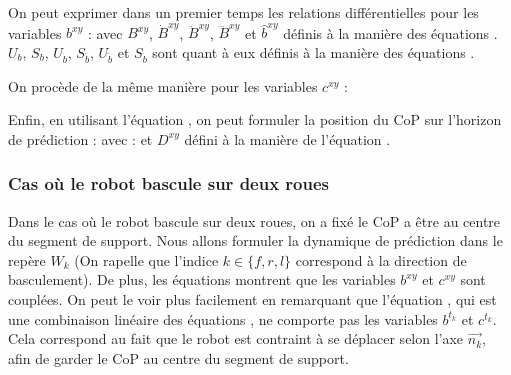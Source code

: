 				On peut exprimer dans un premier temps les relations différentielles pour les variables $b^{xy}$ :
				avec $B^{xy}$, $\dot{B}^{xy}$, $\ddot{B}^{xy}$, $\dddot{B}^{xy}$ et $\hat{b}^{xy}$ définis 
				à la manière des équations .
				$U_b$, $S_b$, $U_{\dot{b}}$, $S_{\dot{b}}$, $U_{\ddot{b}}$ et $S_{\ddot{b}}$ sont quant à eux définis à la manière des équations 
				.
				
				On procède de la même manière pour les variables $c^{xy}$ :
				
				Enfin, en utilisant l'équation , on peut formuler la position du CoP sur l'horizon de prédiction :
				avec :
				et $D^{xy}$ défini à la manière de l'équation .
				
			\subsubsection{Cas où le robot bascule sur deux roues}
			
				
					Dans le cas où le robot bascule sur deux roues, on a fixé le CoP a être au centre du segment de support.
					Nous allons formuler la dynamique de prédiction dans le repère $W_k$ (On rapelle que l'indice $k \in \{f, r, l\}$ correspond à la direction de basculement).
					De plus, les équations  montrent que les variables $b^{xy}$ et $c^{xy}$ sont couplées.
					On peut le voir plus facilement en remarquant que l'équation , qui est une combinaison linéaire des équations , ne comporte pas les variables $b^{t_k}$ et $c^{t_k}$.
					Cela correspond au fait que le robot est contraint à se déplacer selon l'axe $\vec{n_k}$, afin de garder le CoP au centre du segment de support.
					
